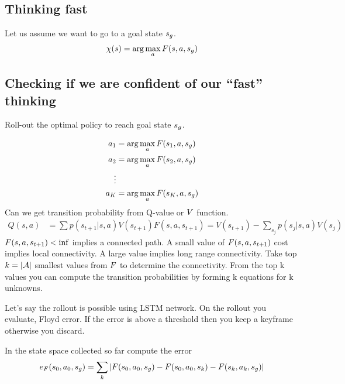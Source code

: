 \subsection{Thinking fast}
Let us assume we want to go to a goal state $s_g$.
%
\begin{align}
    \chi(s) = \arg \max_{a} F(s, a, s_g)
\end{align}
%

\subsection{Checking if we are confident of our ``fast'' thinking}
Roll-out the optimal policy to reach goal state $s_g$.

%
\begin{align}
    a_1 &= \arg \max_{a} F(s_1, a, s_g)
    \\
    a_2 &= \arg \max_{a} F(s_2, a, s_g)
    \\
    \vdots
    \\
    a_K &= \arg \max_{a} F(s_K, a, s_g)
\end{align}%
%
Can we get transition probability from Q-value or $V$ function.
%
\begin{align}
  Q(s, a) &= \sum p(s_{t+1} | s, a)V(s_{t+1})
  F(s, a, s_{t+1}) = V(s_{t+1}) - \sum_{s_j} p(s_j | s, a)V(s_j)
\end{align}
%
$F(s, a, s_{t+1}) < \inf$ implies a connected path. A small value
of $F(s, a, s_{t+1})$ cost implies local connectivity. A large
value implies long range connectivity. Take top $k = |\mathcal{A}|$  smallest values from
$F$ to determine the connectivity. From the top k values you can
compute the transition probabilities by forming k equations for k unknowns.

%
Let's say the rollout is possible using LSTM network. On the rollout
you evaluate, Floyd error. If the error is above a threshold then you
keep a keyframe otherwise you discard.

In the state space collected so far compute the error
\begin{align}
  e_F(s_0, a_0, s_g) = \sum_k | F(s_0, a_0, s_g) - F(s_0, a_0, s_k) - F(s_k, a_k, s_g) |
\end{align}

